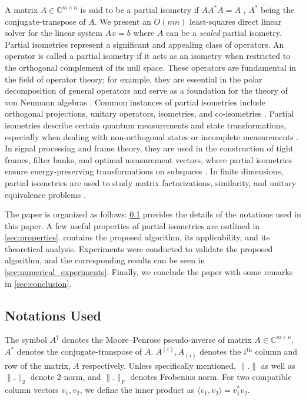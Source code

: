 \documentclass[a4paper,fleqn]{cas-sc}
\theoremstyle{definition}
\theoremstyle{remark}
\begin{document}
A matrix $A \in \mathbb{C}^{m \times n}$ is said to be a partial isometry if $AA^*A=A$ \cite{partialisometryarxiv}, $A^*$ being the conjugate-transpose of $A$. We present an $O(mn)$ least-squares direct linear solver for the linear system $Ax=b$ where $A$ can be a \emph{scaled} partial isometry. Partial isometries represent a significant and appealing class of operators. An operator is called a partial isometry if it acts as an isometry when restricted to the orthogonal complement of its null space. These operators are fundamental in the field of operator theory; for example, they are essential in the polar decomposition of general operators and serve as a foundation for the theory of von Neumann algebras \cite{partialisometryelsiver}. Common instances of partial isometries include orthogonal projections, unitary operators, isometries, and co-isometries \cite{partialisometryelsiver}. Partial isometries describe certain quantum measurements and state transformations, especially when dealing with non-orthogonal states or incomplete measurements \cite{partialisometryieee}. In signal processing and frame theory, they are used in the construction of tight frames, filter banks, and optimal measurement vectors, where partial isometries ensure energy-preserving transformations on subspaces \cite{partialisometryieee}. In finite dimensions, partial isometries are used to study matrix factorizations, similarity, and unitary equivalence problems \cite{partialisometryarxiv}.

The paper is organized as follows: \cref{subsec:notation} provides the details of the notations used in this paper. A few useful properties of partial isometries are outlined in \cref{sec:properties}.  contains the proposed algorithm, its applicability, and its theoretical analysis. Experiments were conducted to validate the proposed algorithm, and the corresponding results can be seen in \cref{sec:numerical_experiments}. Finally, we conclude the paper with some remarks in \cref{sec:conclusion}.

\subsection{Notations Used}\label{subsec:notation}
The symbol $A^{\dagger}$ denotes the Moore–Penrose pseudo-inverse \cite{svd} of matrix $A \in \mathbb{C}^{m \times n}$. $A^*$ denotes the conjugate-transpose of $A$. $A^{(i)}, A_{(i)}$ denotes the $i^{\text{th}}$ column and row of the matrix, $A$ respectively. Unless specifically mentioned, $\|.\|$ as well as $\|.\|_2$ denote 2-norm, and $\|.\|_F$ denotes Frobenius norm. For two compatible column vectors $v_1,v_2$, we define the inner product as $\langle v_1, v_2\rangle = v_1^*v_2$.
\end{document}
